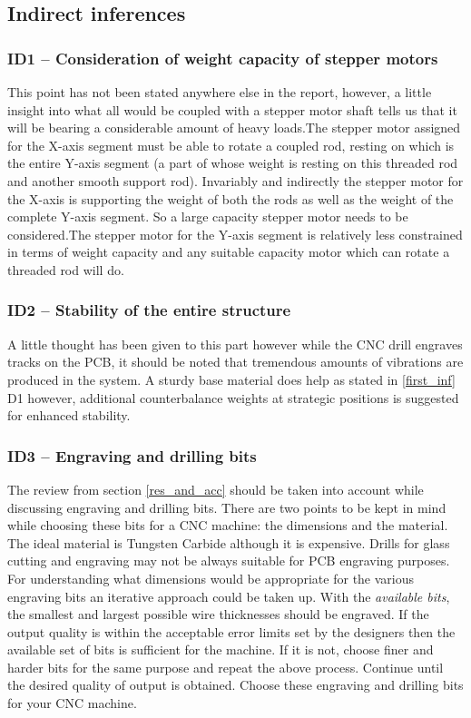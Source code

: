 \subsection{Indirect inferences}

\subsubsection*{ID1 – Consideration of weight capacity of stepper motors}

This point has not been stated anywhere else in the report, however, a little insight into what all would be coupled with a stepper motor shaft tells us that it will be bearing a considerable amount of heavy loads.The stepper motor assigned for the X-axis segment must be able to rotate a coupled rod, resting on which is the entire Y-axis segment (a part of whose weight is resting on this threaded rod and another smooth support rod). Invariably and indirectly the stepper motor for the X-axis is supporting the weight of both the rods as well as the weight of the complete Y-axis segment. So a large capacity stepper motor needs to be considered.The stepper motor for the Y-axis segment is relatively less constrained in terms of weight capacity and any suitable capacity motor which can rotate a threaded rod will do.

\subsubsection*{ID2 – Stability of the entire structure}

A little thought has been given to this part however while the CNC drill engraves tracks on the PCB, it should be noted that tremendous amounts of vibrations are produced in the system. A sturdy base material does help as stated in \ref{first_inf} D1 however, additional counterbalance weights at strategic positions is suggested for enhanced stability.

\subsubsection*{ID3 – Engraving and drilling bits}

The review from section \ref{res_and_acc} should be taken into account while discussing engraving and drilling bits. There are two points to be kept in mind while choosing these bits for a CNC machine: the dimensions and the material. The ideal material is Tungsten Carbide although it is expensive. Drills for glass cutting and engraving may not be always suitable for PCB engraving purposes. For understanding what dimensions would be appropriate for the various engraving bits an iterative approach could be taken up. With the \textit{available bits}, the smallest and largest possible wire thicknesses should be engraved. If the output quality is within the acceptable error limits set by the designers then the available set of bits is sufficient for the machine. If it is not, choose finer and harder bits for the same purpose and repeat the above process. Continue until the desired quality of output is obtained. Choose these engraving and drilling bits for your CNC machine.

